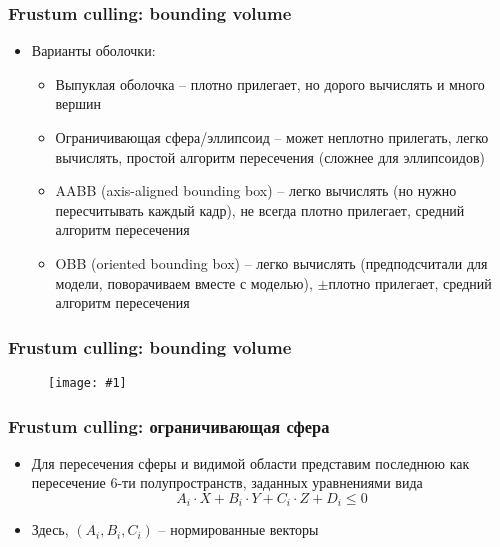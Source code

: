 \documentclass{beamer}
\newcommand{\slideimage}[1]{
  \begin{figure}
    \begin{adjustbox}{width=\textwidth, totalheight=\textheight-2\baselineskip-2\baselineskip,keepaspectratio}
      \texttt{[image: \#1]}
    \end{adjustbox}
  \end{figure}
}
\begin{document}
\begin{frame}[fragile]
\frametitle{Frustum culling: bounding volume}
\begin{itemize}
\item Варианты оболочки:
\pause
\begin{itemize}
\item Выпуклая оболочка -- плотно прилегает, но дорого вычислять и много вершин
\pause
\item Ограничивающая сфера/эллипсоид -- может неплотно прилегать, легко вычислять, простой алгоритм пересечения (сложнее для эллипсоидов)
\pause
\item AABB (axis-aligned bounding box) -- легко вычислять (но нужно пересчитывать каждый кадр), не всегда плотно прилегает, средний алгоритм пересечения
\pause
\item OBB (oriented bounding box) -- легко вычислять (предподсчитали для модели, поворачиваем вместе с моделью), \begin{math}\pm\end{math}плотно прилегает, средний алгоритм пересечения
\end{itemize}
\end{itemize}
\end{frame}

\begin{frame}[fragile]
\frametitle{Frustum culling: bounding volume}
\slideimage{bounding_volumes.png}
\end{frame}

\begin{frame}[fragile]
\frametitle{Frustum culling: ограничивающая сфера}
\begin{itemize}
\item Для пересечения сферы и видимой области представим последнюю как пересечение 6-ти полупространств, заданных уравнениями вида
\begin{equation*}
A_i \cdot X + B_i \cdot Y + C_i \cdot Z + D_i \leq 0
\end{equation*}
\pause
\item Здесь, \begin{math}(A_i,B_i,C_i)\end{math} -- нормированные векторы
\end{itemize}
\end{frame}
\end{document}
